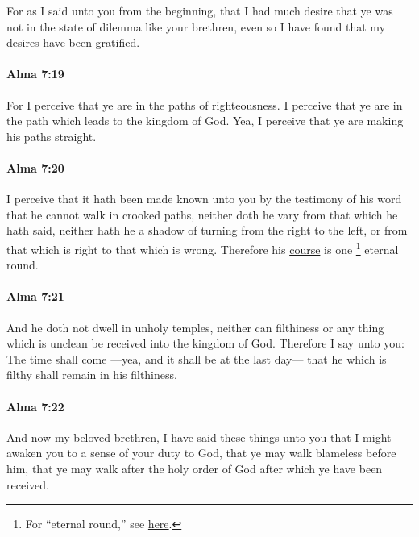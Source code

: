 			For as I said unto you from the beginning,
			that I had much desire
			that ye was not in the state of dilemma like your brethren,
			even so I have found that my desires have been gratified.

		\paragraph{Alma 7:19} %
			\label{ALMA-7-19}

			For I perceive that ye are in the paths of righteousness.
			I perceive that ye are in the path which leads to the kingdom of God.
			Yea, I perceive that ye are making his paths straight.

		\paragraph{Alma 7:20} %
			\label{ALMA-7-20}

			I perceive that it hath been made known unto you by the testimony of his word
			that he cannot walk in crooked paths,
			neither doth he vary from that which he hath said,
			neither hath he a shadow of turning from the right to the left,
			or from that which is right to that which is wrong.
			Therefore his \hyperref[COURSE]{course} is one
				\footnote{%
					For ``eternal round,'' see \hyperref[ROUND-PHRASES]{here}.
					}%
			eternal round.

		\paragraph{Alma 7:21} %
			\label{ALMA-7-21}

			And he doth not dwell in unholy temples,
			neither can filthiness or any thing which is unclean
			be received into the kingdom of God.
			Therefore I say unto you:
			The time shall come
			---yea, and it shall be at the last day---
			that he which is filthy shall remain in his filthiness.

		\paragraph{Alma 7:22} %
			\label{ALMA-7-22}

			And now my beloved brethren, I have said these things unto you
			that I might awaken you to a sense of your duty to God,
			that ye may walk blameless before him,
			that ye may walk after the holy order of God
			after which ye have been received.

